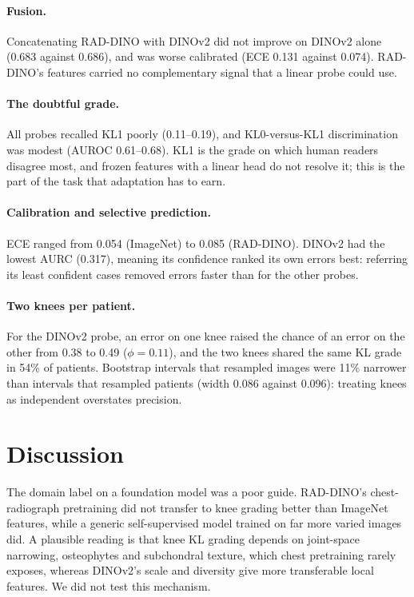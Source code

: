\documentclass[11pt]{article}
\begin{document}


\paragraph{Fusion.} Concatenating RAD-DINO with DINOv2 did not improve on DINOv2 alone (0.683 against 0.686), and was worse calibrated
(ECE 0.131 against 0.074). RAD-DINO's features carried no complementary signal that a linear probe could use.

\paragraph{The doubtful grade.} All probes recalled KL1 poorly (0.11--0.19), and KL0-versus-KL1 discrimination was modest (AUROC
0.61--0.68). KL1 is the grade on which human readers disagree most, and frozen features with a linear head do not resolve it; this is the
part of the task that adaptation has to earn.

\paragraph{Calibration and selective prediction.} ECE ranged from 0.054 (ImageNet) to 0.085 (RAD-DINO). DINOv2 had the lowest AURC
(0.317), meaning its confidence ranked its own errors best: referring its least confident cases removed errors faster than for the other
probes.

\paragraph{Two knees per patient.} For the DINOv2 probe, an error on one knee raised the chance of an error on the other from 0.38 to
0.49 (\(\phi=0.11\)), and the two knees shared the same KL grade in 54\% of patients. Bootstrap intervals that resampled images were
11\% narrower than intervals that resampled patients (width 0.086 against 0.096): treating knees as independent overstates precision.

\section{Discussion}
The domain label on a foundation model was a poor guide. RAD-DINO's chest-radiograph pretraining did not transfer to knee grading better
than ImageNet features, while a generic self-supervised model trained on far more varied images did. A plausible reading is that knee KL
grading depends on joint-space narrowing, osteophytes and subchondral texture, which chest pretraining rarely exposes, whereas DINOv2's
scale and diversity give more transferable local features. We did not test this mechanism.
\end{document}
